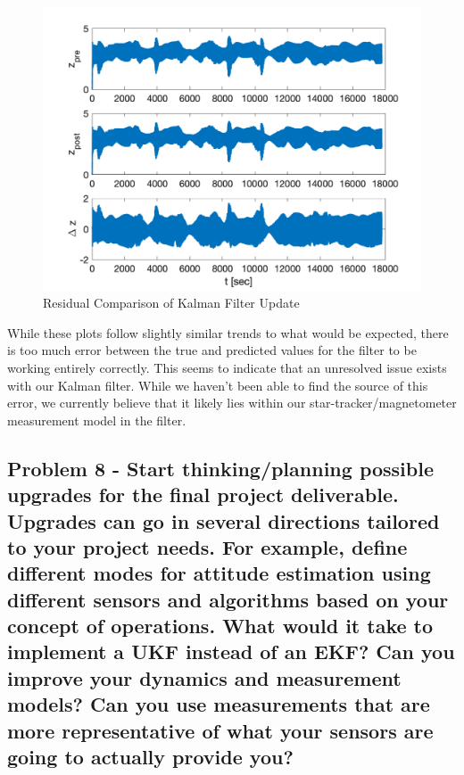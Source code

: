 \begin{figure}[H]
    \centering
    \captionsetup{ justification = centering }
    \includegraphics[width = 12cm]{Images/PS8/kalman_filter_meas_update_residual_comparison.png}
    \caption{Residual Comparison of Kalman Filter Update}
    \label{fig:kalman_residual}
\end{figure}

While these plots follow slightly similar trends to what would be expected, there is too much error between the true and predicted values for the filter to be working entirely correctly. This seems to indicate that an unresolved issue exists with our Kalman filter. While we haven't been able to find the source of this error, we currently believe that it likely lies within our star-tracker/magnetometer measurement model in the filter.

\subsection{Problem 8 - Start thinking/planning possible upgrades for the final project deliverable. Upgrades can go in several directions tailored to your project needs. For example, define different modes for attitude estimation using different sensors and algorithms based on your concept of operations. What would it take to implement a UKF instead of an EKF? Can you improve your dynamics and measurement models? Can you use measurements that are more representative of what your sensors are going to actually provide you?}

